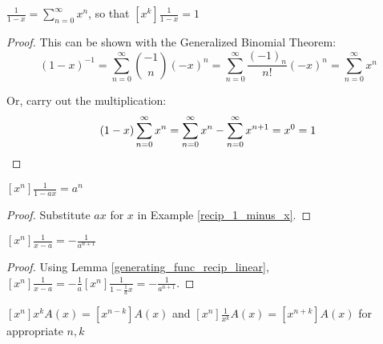 \documentclass[a4paper]{article}
\begin{document}
\begin{example}\label{recip_1_minus_x}
$\displaystyle\frac1{1-x}=\sum_{n=0}^\infty x^n$, so that $\displaystyle[x^k]\frac1{1-x}=1$

\begin{hl}
\begin{proof}
This can be shown with the Generalized Binomial Theorem:
\begin{equation*}
(1-x)^{-1}=\sum_{n=0}^\infty\binom{-1}n(-x)^n=\sum_{n=0}^\infty\frac{(-1)_n}{n!}(-x)^n=\sum_{n=0}^\infty x^n
\end{equation*}

Or, carry out the multiplication:
\begin{equation*}
(1-x)\sum_{n=0}^\infty x^n=\sum_{n=0}^\infty x^n-\sum_{n=0}^\infty x^{n+1}=x^0=1\qedhere
\end{equation*}
\end{proof}
\end{hl}
\end{example}

\begin{lemma}\label{generating_func_recip_linear}
$\displaystyle[x^n]\frac1{1-ax}=a^n$

\begin{hl}
\begin{proof}
Substitute $ax$ for $x$ in Example \ref{recip_1_minus_x}.
\end{proof}
\end{hl}
\end{lemma}

\begin{lemma}\label{easier_gen_linear}
$\displaystyle[x^n]\frac1{x-a}=-\frac1{a^{n+1}}$

\begin{hl}
\begin{proof}
Using Lemma \ref{generating_func_recip_linear}, $\displaystyle [x^n]\frac1{x-a}=-\frac1a[x^n]\frac1{1-\frac1ax}=-\frac1{a^{n+1}}$.
\end{proof}
\end{hl}
\end{lemma}

\begin{example}
$[x^n]x^kA(x)=[x^{n-k}]A(x)$ and $\displaystyle[x^n]\frac1{x^k}A(x)=[x^{n+k}]A(x)$ for appropriate $n,k$
\end{example}
\end{document}
